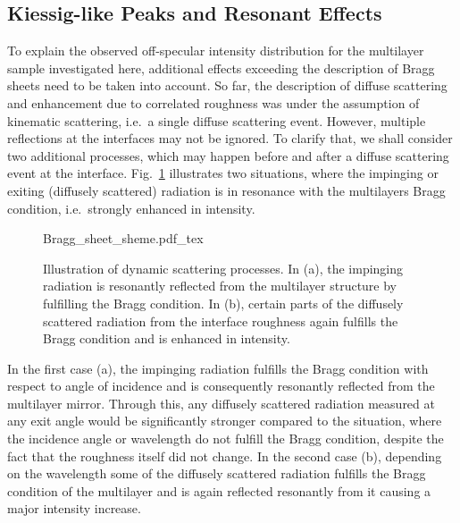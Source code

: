 \subsection{Kiessig-like Peaks and Resonant Effects}
To explain the observed off-specular intensity distribution for the multilayer sample investigated here, additional effects exceeding the description of Bragg sheets need to be taken into account. So far, the description of diffuse scattering and enhancement due to correlated roughness was under the assumption of kinematic scattering, i.e.~a single diffuse scattering event. However, multiple reflections at the interfaces may not be ignored. To clarify that, we shall consider two additional processes, which may happen before and after a diffuse scattering event at the interface. Fig.~\ref{ch_diff:fig_kiessig_like_peaks_scheme} illustrates two situations, where the impinging or exiting (diffusely scattered) radiation is in resonance with the multilayers Bragg condition, i.e.~strongly enhanced in intensity.
\begin{figure}[htb]
    {Bragg_sheet_sheme.pdf_tex}
    \caption[Illustration of dynamic scattering processes]{Illustration of dynamic scattering processes. In (a), the impinging radiation is resonantly reflected from the multilayer structure by fulfilling the Bragg condition. In (b), certain parts of the diffusely scattered radiation from the interface roughness again fulfills the Bragg condition and is enhanced in intensity.}
    \label{ch_diff:fig_kiessig_like_peaks_scheme}
\end{figure}
In the first case (a), the impinging radiation fulfills the Bragg condition with respect to angle of incidence and is consequently resonantly reflected from the multilayer mirror. Through this, any diffusely scattered radiation measured at any exit angle would be significantly stronger compared to the situation, where the incidence angle or wavelength do not fulfill the Bragg condition, despite the fact that the roughness itself did not change. In the second case (b), depending on the wavelength some of the diffusely scattered radiation fulfills the Bragg condition of the multilayer and is again reflected resonantly from it causing a major intensity increase.

